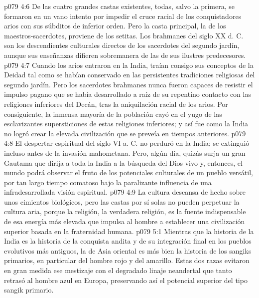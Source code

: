 \vs p079 4:6 De las cuatro grandes castas existentes, todas, salvo la primera, se formaron en un vano intento por impedir el cruce racial de los conquistadores arios con sus súbditos de inferior orden. Pero la casta principal, la de los maestros\hyp{}sacerdotes, proviene de los setitas. Los brahmanes del siglo XX d. C. son los descendientes culturales directos de los sacerdotes del segundo jardín, aunque sus enseñanzas difieren sobremanera de las de sus ilustres predecesores.
\vs p079 4:7 Cuando los arios entraron en la India, traían consigo sus conceptos de la Deidad tal como se habían conservado en las persistentes tradiciones religiosas del segundo jardín. Pero los sacerdotes brahmanes nunca fueron capaces de resistir el impulso pagano que se había desarrollado a raíz de su repentino contacto con las religiones inferiores del Decán, tras la aniquilación racial de los arios. Por consiguiente, la inmensa mayoría de la población cayó en el yugo de las esclavizantes supersticiones de estas religiones inferiores; y así fue como la India no logró crear la elevada civilización que se preveía en tiempos anteriores.
\vs p079 4:8 El despertar espiritual del siglo VI a. C. no perduró en la India; se extinguió incluso antes de la invasión mahometana. Pero, algún día, quizás surja un gran Gautama que dirija a toda la India a la búsqueda del Dios vivo y, entonces, el mundo podrá observar el fruto de los potenciales culturales de un pueblo versátil, por tan largo tiempo comatoso bajo la paralizante influencia de una infradesarrollada visión espiritual.
\vs p079 4:9 La cultura descansa de hecho sobre unos cimientos biológicos, pero las castas por sí solas no pueden perpetuar la cultura aria, porque la religión, la verdadera religión, es la fuente indispensable de esa energía más elevada que impulsa al hombre a establecer una civilización superior basada en la fraternidad humana.
\vs p079 5:1 Mientras que la historia de la India es la historia de la conquista andita y de su integración final en los pueblos evolutivos más antiguos, la de Asia oriental es más bien la historia de los sangiks primarios, en particular del hombre rojo y del amarillo. Estas dos razas evitaron en gran medida ese mestizaje con el degradado linaje neandertal que tanto retrasó al hombre azul en Europa, preservando así el potencial superior del tipo sangik primario.
